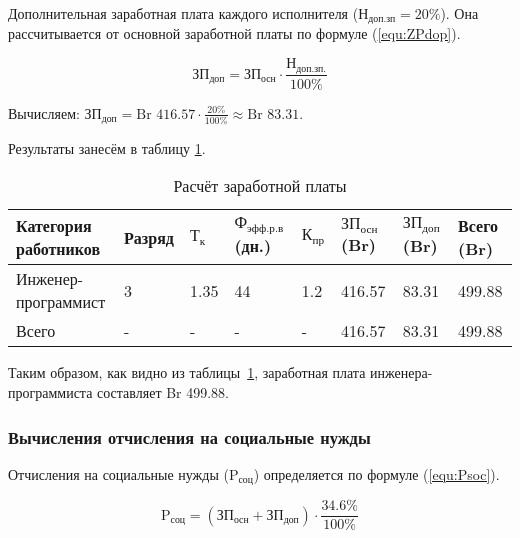 Дополнительная заработная плата каждого исполнителя
($\text{Н}_\text{доп.зп} = 20\%$).
Она рассчитывается от основной заработной платы по формуле (\ref{equ:ZPdop}).

\begin{equation}
    \label{equ:ZPdop}
    \text{ЗП}_\text{доп} = \text{ЗП}_\text{осн} \cdot \frac{ \text{Н}_\text{доп.зп.} }{ 100\% }
\end{equation}

Вычисляем: $\text{ЗП}_\text{доп} = \text{Br }416.57 \cdot \frac{ 20\% }{ 100\% } \approx \text{Br } 83.31$.

Результаты занесём в таблицу \ref{tab:ZPRezult}.

\begin{table}[ht]
    \centering\small

    \caption{Расчёт заработной платы}
    \label{tab:ZPRezult}

    \begin{tabular}{|p{4.5cm}|p{1.5cm}|p{1cm}|p{1.5cm}|p{1cm}|p{1.5cm}|p{1.5cm}|p{1.5cm}|}
        \hline
        Категория работников
        & Разряд
        & $\text{Т}_\text{к}$
        & $\text{Ф}_\text{эфф.р.в}$ (дн.)
        & $\text{К}_\text{пр}$
        & $\text{ЗП}_\text{осн}$ (Br)
        & $\text{ЗП}_\text{доп}$ (Br)
        & Всего (Br)
        \\ \hline

        Инженер-программист
        & 3
        & 1.35
        & 44
        & 1.2
        & 416.57
        & 83.31
        & 499.88
        \\ \hline

        Всего
        & -
        & -
        & -
        & -
        & 416.57
        & 83.31
        & 499.88
        \\ \hline
    \end{tabular}
\end{table}

Таким образом, как видно из таблицы~\ref{tab:ZPRezult}, заработная плата инженера-программиста составляет Br 499.88.

\subsubsection*{Вычисления отчисления на социальные нужды}

Отчисления на социальные нужды ($\text{P}_\text{соц}$) определяется по формуле (\ref{equ:Psoc}).

\begin{equation}
    \label{equ:Psoc}
    \text{P}_\text{соц} = (\text{ЗП}_\text{осн} + \text{ЗП}_\text{доп}) \cdot \frac{ 34.6\% }{ 100\% }
\end{equation}

